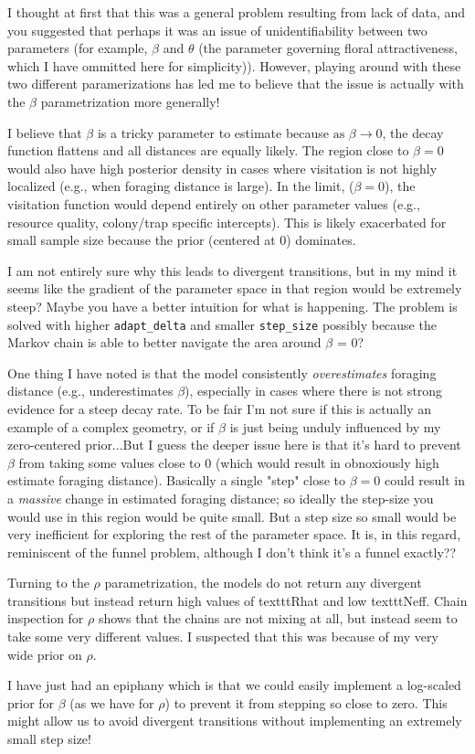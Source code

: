 \documentclass[12pt]{article}
\begin{document}
I thought at first that this was a general problem resulting from lack of data, and you suggested that perhaps it was an issue of unidentifiability between two parameters (for example, $\beta$ and $\theta$ (the parameter governing floral attractiveness, which I have ommitted here for simplicity)). However, playing around with these two different paramerizations has led me to believe that the issue is actually with the $\beta$ parametrization more generally!

I believe that $\beta$ is a tricky parameter to estimate because $\text{as } \beta \to 0$, the decay function flattens and all distances are equally likely. The region close to $\beta = 0$ would also have high posterior density in cases where visitation is not highly localized (e.g., when foraging distance is large). In the limit, ($\beta = 0$), the visitation function would depend entirely on other parameter values (e.g., resource quality, colony/trap specific intercepts). This is likely exacerbated for small sample size because the prior (centered at 0) dominates.

I am not entirely sure why this leads to divergent transitions, but in my mind it seems like the gradient of the parameter space in that region would be extremely steep? Maybe you have a better intuition for what is happening. The problem is solved with higher \texttt{adapt_delta} and smaller \texttt{step_size} possibly because the Markov chain is able to better navigate the area around $\beta$ = 0?

One thing I have noted is that the model consistently \textit{overestimates} foraging distance (e.g., underestimates $\beta$), especially in cases where there is not strong evidence for a steep decay rate. To be fair I'm not sure if this is actually an example of a complex geometry, or if $\beta$ is just being unduly influenced by my zero-centered prior...But I guess the deeper issue here is that it's hard to prevent $\beta$ from taking some values close to 0 (which would result in obnoxiously high estimate foraging distance). Basically a single "step" close to $\beta = 0$ could result in a \textit{massive} change in estimated foraging distance; so ideally the step-size you would use in this region would be quite small. But a step size so small would be very inefficient for exploring the rest of the parameter space. It is, in this regard, reminiscent of the funnel problem, although I don't think it's a funnel exactly??


Turning to the $\rho$ parametrization, the models do not return any divergent transitions but instead return high values of texttt{Rhat} and low texttt{Neff}. Chain inspection for $\rho$ shows that the chains are not mixing at all, but instead seem to take some very different values. I suspected that this was because of my very wide prior on $\rho$.

I have just had an epiphany which is that we could easily implement a log-scaled prior for $\beta$ (as we have for $\rho$) to prevent it from stepping so close to zero. This might allow us to avoid divergent transitions without implementing an extremely small step size!
\end{document}
